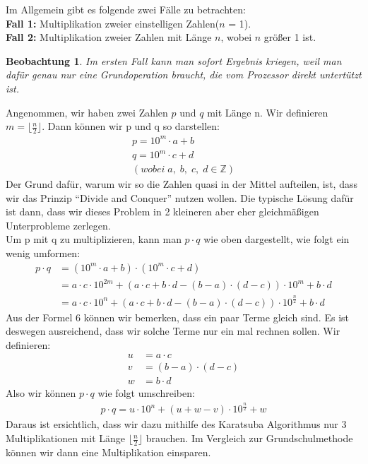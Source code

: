\documentclass[11pt,a4paper, twoside]{article}
\newtheorem{observation}[theorem]{Beobachtung}
\theoremstyle{definition}
\begin{document}
Im Allgemein gibt es folgende zwei Fälle zu betrachten: \\
\textbf{Fall 1:} Multiplikation zweier einstelligen Zahlen(\(n\) = 1).\\
\textbf{Fall 2:} Multiplikation zweier Zahlen mit Länge \(n\), wobei \(n\) größer 1 ist.\\
\begin{observation}
Im ersten Fall kann man sofort Ergebnis kriegen, weil man dafür genau nur eine Grundoperation braucht, die vom Prozessor direkt untertützt ist. 
\end{observation}


Angenommen, wir haben zwei Zahlen \(p\) und \(q\) mit Länge n. Wir definieren $m = \lfloor \frac{n}{2} \rfloor$. Dann können wir p und q so darstellen: 
\begin{align*}
p = 10^{m} \cdot a + b\\
q = 10^{m} \cdot c + d\\
(wobei \;a, \;b, \;c, \;d \in \mathbb{Z})
\end{align*}
Der Grund dafür, warum wir so die Zahlen quasi in der Mittel aufteilen, ist, dass wir das Prinzip “Divide and Conquer” nutzen wollen. Die typische Lösung dafür ist dann, dass wir dieses Problem in 2 kleineren aber eher gleichmäßigen Unterprobleme zerlegen.\\
Um p mit q zu multiplizieren, kann man $p \cdot q$ wie oben dargestellt, wie folgt ein wenig umformen: 
\begin{align}
p \cdot q &= (10^{m} \cdot a + b) \cdot (10^{m} \cdot c + d)\\
				 &= a\cdot c\cdot 10^{2m} + (a \cdot c + b \cdot d - (b - a) \cdot (d - c)) \cdot 10^{m} + b \cdot d\\
				 &= a\cdot c\cdot 10^{n} + (a \cdot c + b \cdot d - (b - a) \cdot (d - c)) \cdot 10^{\frac{n}{2}} + b \cdot d
\end{align}
Aus der Formel 6 können wir bemerken, dass ein paar Terme gleich sind. Es ist deswegen ausreichend, dass wir solche Terme nur ein mal rechnen sollen. Wir definieren: 
\begin{align*}
u &= a \cdot c\\
v &= (b - a) \cdot (d - c)\\
w &= b \cdot d
\end{align*}
Also wir können $p \cdot q$ wie folgt umschreiben: 
\begin{align*}
p \cdot q = u \cdot 10^{n} + (u + w - v) \cdot 10^{\frac{n}{2}} + w
\end{align*}
Daraus ist ersichtlich, dass wir dazu mithilfe des Karatsuba Algorithmus nur 3 Multiplikationen mit Länge $\lfloor \frac{n}{2} \rfloor$ brauchen. Im Vergleich zur Grundschulmethode können wir dann eine Multiplikation einsparen.
\end{document}
